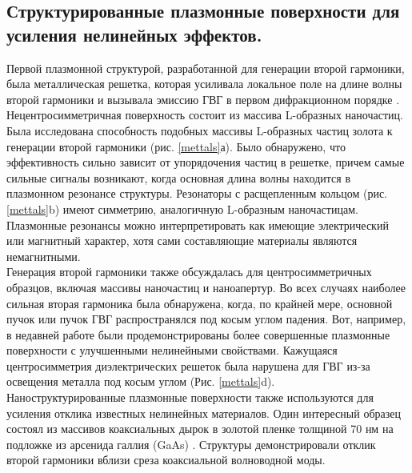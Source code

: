 \subsection*{Структурированные плазмонные поверхности для усиления нелинейных эффектов.}
\hspace*{2mm}
Первой плазмонной структурой, разработанной для генерации второй гармоники, была металлическая решетка, которая усиливала локальное поле на длине волны второй гармоники и вызывала эмиссию ГВГ  в первом дифракционном порядке \cite{grosse2012nonlinear}. 
\\
Нецентросимметричная поверхность состоит из массива L-образных наночастиц. Была исследована  способность подобных массивы L-образных частиц золота к генерации второй гармоники (рис. \ref{mettals}а). Было обнаружено, что эффективность сильно зависит от упорядочения частиц в решетке, причем самые сильные сигналы возникают, когда основная длина волны находится в плазмонном резонансе структуры. Резонаторы с расщепленным кольцом \cite{linden2012collective} (рис. \ref{mettals}b) имеют симметрию, аналогичную L-образным наночастицам. Плазмонные резонансы можно интерпретировать как имеющие электрический или магнитный характер, хотя сами составляющие материалы являются немагнитными. 
\\
\hspace*{2mm}
Генерация второй гармоники также обсуждалась для центросимметричных образцов, включая массивы наночастиц и наноапертур. Во всех случаях наиболее сильная вторая гармоника была обнаружена, когда, по крайней мере, основной пучок или пучок ГВГ распространялся под косым углом падения. Вот, например, в недавней работе были продемонстрированы более совершенные плазмонные поверхности с улучшенными нелинейными свойствами. Кажущаяся центросимметрия диэлектрических решеток была нарушена для ГВГ из-за освещения металла под косым углом \cite{genevet2010large} (Рис. \ref{mettals}d). 
\\
\hspace*{2mm}
Наноструктурированные плазмонные поверхности также используются для усиления отклика известных нелинейных материалов. Один интересный образец состоял из массивов коаксиальных дырок в золотой пленке толщиной 70 нм на подложке из арсенида галлия (GaAs)  \cite{fan2006second}. Структуры демонстрировали отклик второй гармоники вблизи среза коаксиальной волноводной моды.

